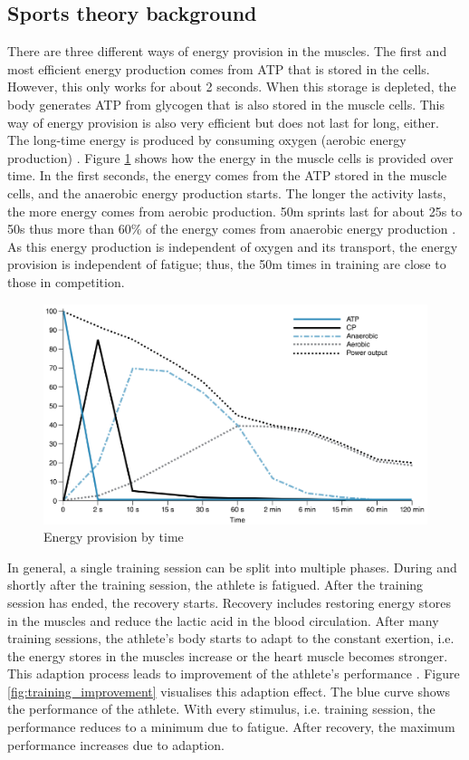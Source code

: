 \subsection{Sports theory background}
There are three different ways of energy provision in the muscles. The first and most efficient energy production comes from ATP that is stored in the cells. However, this only works for about 2 seconds. When this storage is depleted, the body generates ATP from glycogen that is also stored in the muscle cells. This way of energy provision is also very efficient but does not last for long, either. The long-time energy is produced by consuming oxygen (aerobic energy production) \cite{Bompa.2018}. Figure \ref{fig:energy_provision} shows how the energy in
the muscle cells is provided over time.  In the first seconds, the energy comes from the ATP stored in the muscle cells, and the anaerobic energy production starts.  The longer the activity lasts, the more energy comes from aerobic production. 50m sprints last for about 25s to 50s thus more than 60\% of the energy comes from anaerobic energy production \cite{Dr.PatriziaMayerHaralOchwatweitereBSVDozenten.2007} . As this energy production is independent of oxygen and its transport, the energy provision is independent of fatigue; thus, the 50m times in training are close to those in competition.
\begin{figure}[ht]
    \centering
    \includegraphics[scale=0.5]{visualisation/energy_provision.png}
    \caption{Energy provision by time \cite{Bompa.2018}}
    \label{fig:energy_provision}
\end{figure}
In general, a single training session can be split into multiple phases. During and shortly after the training session, the athlete is fatigued. After the training session has ended, the recovery starts. Recovery includes restoring energy stores in the muscles and reduce the lactic acid in the blood circulation. After many training sessions, the athlete's body starts to adapt to the constant exertion, i.e. the energy stores in the muscles increase or the heart muscle becomes stronger. This adaption process leads to improvement of the athlete's performance \cite{Bompa.2018.adaption}. Figure \ref{fig:training_improvement} visualises this adaption effect. The blue curve shows the performance of the athlete. With every stimulus, i.e. training session, the performance reduces to a minimum due to fatigue. After recovery, the maximum performance increases due to adaption.
